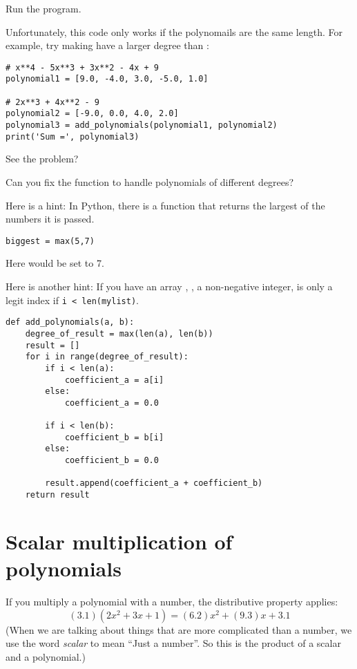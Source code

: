 Run the program.

Unfortunately, this code only works if the polynomails are the same length. For
example, try making  have a larger degree than
:
\begin{Verbatim}
# x**4 - 5x**3 + 3x**2 - 4x + 9
polynomial1 = [9.0, -4.0, 3.0, -5.0, 1.0]
  
# 2x**3 + 4x**2 - 9  
polynomial2 = [-9.0, 0.0, 4.0, 2.0]
polynomial3 = add_polynomials(polynomial1, polynomial2)
print('Sum =', polynomial3)
\end{Verbatim}

See the problem?

\begin{Exercise}[title=Dealing with polynomials of different degrees, label=pyaddpolys]
  
Can you fix the function  to handle polynomials of different degrees?

Here is a hint: In Python, there is a  function that returns the largest of the numbers it is passed.
\begin{Verbatim}
biggest = max(5,7)
\end{Verbatim}
Here  would be set to 7.

Here is another hint: If you have an array , ,
a non-negative integer, is only a legit index if \texttt{i <
  len(mylist)}.
\end{Exercise}
\begin{Answer}[ref=pyaddpolys]
\begin{Verbatim}
def add_polynomials(a, b):
    degree_of_result = max(len(a), len(b))
    result = []
    for i in range(degree_of_result):
        if i < len(a):
            coefficient_a = a[i]
        else:
            coefficient_a = 0.0   

        if i < len(b):
            coefficient_b = b[i]
        else:
            coefficient_b = 0.0
            
        result.append(coefficient_a + coefficient_b)
    return result
\end{Verbatim}
\end{Answer}

\section{Scalar multiplication of  polynomials}

If you multiply a polynomial with a number, the distributive property applies:
\begin{equation*}
  (3.1)(2x^2 + 3x + 1) = (6.2)x^2 + (9.3)x + 3.1
\end{equation*}
(When we are talking about things that are more complicated than a number, we use the word \emph{scalar} to mean ``Just a number''. So this is the product of a scalar and a polynomial.)

